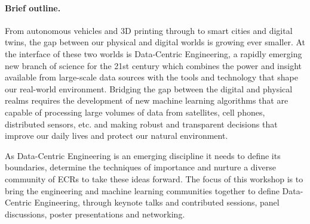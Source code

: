 \documentclass[11pt,a4paper]{scrartcl}
\theoremstyle{plain}  %
\begin{document}




\paragraph{Brief outline.} From autonomous vehicles and 3D printing through to smart cities and digital twins, the gap between our physical and digital worlds is growing ever smaller. At the interface of these two worlds is Data-Centric Engineering, a rapidly emerging new branch of science for the 21st century which combines the power and insight available from large-scale data sources with the tools and technology that shape our real-world environment. Bridging the gap between the digital and physical realms requires the development of new machine learning algorithms that are capable of processing large volumes of data from satellites, cell phones, distributed sensors, etc. and making robust and transparent decisions that improve our daily lives and protect our natural environment. 

As Data-Centric Engineering is an emerging discipline it needs to define its boundaries, determine the techniques of importance and nurture a diverse community of ECRs to take these ideas forward. The focus of this workshop is to bring the engineering and machine learning communities together to define Data-Centric Engineering, through keynote talks and contributed sessions, panel discussions, poster presentations and networking.
\end{document}
